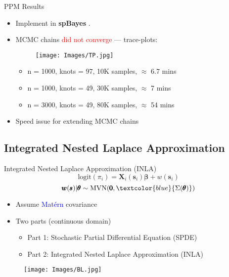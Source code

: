 \documentclass{beamer}
\begin{document}
\begin{frame}{PPM Results}

\begin{itemize}
\addtolength{\itemsep}{0.5\baselineskip}
\item Implement in {\bf spBayes} \citep{Finley2013}.
\item MCMC chains \textcolor{red}{did not converge} --- trace-plots:
  \begin{figure}[H]
	\centering
	\texttt{[image: Images/TP.jpg]}
	\end{figure}
      \begin{itemize}
      \addtolength{\itemsep}{0.5\baselineskip}
      \item n = 1000, knots = 97, 10K samples, $\approx$ 6.7 mins
      \item n = 1000, knots = 49, 30K samples, $\approx$ 7 mins
      \item n = 3000, knots = 49, 80K samples, $\approx$ 54 mins
      \end{itemize}
\item Speed issue for extending MCMC chains
\end{itemize}

\end{frame}

\subsection{Integrated Nested Laplace Approximation}

\begin{frame}{Integrated Nested Laplace Approximation (INLA)}{\citep{Rue2009}}
$$ \text{logit}(\pi_{i}) = \pmb{X}_{i}(\pmb{s}_{i})\pmb{\beta} + w(\pmb{s}_{i}) $$
$$\pmb{w}(\pmb{s}) | \pmb{\theta} \sim \text{MVN}(\pmb{0}, \textcolor{blue}{\Sigma(\pmb{\theta})})$$
\begin{itemize}
\addtolength{\itemsep}{0.5\baselineskip}
\item Assume \textcolor{blue}{Mat\'ern} covariance
\item Two parts (continuous domain) \\
  \begin{itemize}
  \addtolength{\itemsep}{0.5\baselineskip}
  \item Part 1: Stochastic Partial Differential Equation (SPDE)
  \item Part 2: Integrated Nested Laplace Approximation (INLA)
  \end{itemize}
\end{itemize}
  \begin{figure}[H]
	\centering
	\texttt{[image: Images/BL.jpg]}
	\end{figure}
	
\end{frame}
\end{document}
